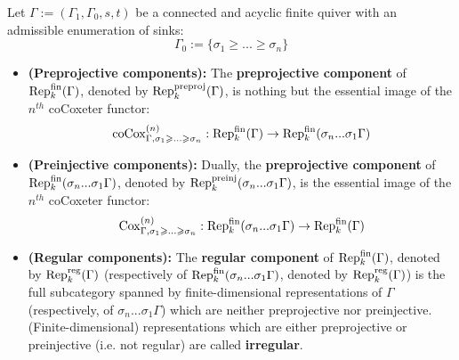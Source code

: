             \begin{definition} \label{def: preprojective_regular_and_preinjective_components}
                Let $\Gamma := (\Gamma_1, \Gamma_0, s, t)$ be a connected and acyclic finite quiver with an admissible enumeration of sinks:
                    $$\Gamma_0 := \{\sigma_1 \geq ... \geq \sigma_n\}$$
                    \begin{itemize}
                        \item \textbf{(Preprojective components):} The \textbf{preprojective component} of $\mathrm{Rep}_k^{\mathrm{fin}}(\Gamma)$, denoted by $\mathrm{Rep}_k^{\mathrm{preproj}}(\Gamma)$, is nothing but the essential image of the $n^{th}$ coCoxeter functor:
                            $$\mathrm{co}\mathrm{Cox}_{\Gamma, \sigma_1 \geqslant ...\geqslant \sigma_n}^{(n)}: \mathrm{Rep}_k^{\mathrm{fin}}(\Gamma) \to \mathrm{Rep}_k^{\mathrm{fin}}(\sigma_n ... \sigma_1 \Gamma)$$
                        \item \textbf{(Preinjective components):} Dually, the \textbf{preprojective component} of $\mathrm{Rep}_k^{\mathrm{fin}}(\sigma_n ... \sigma_1 \Gamma)$, denoted by $\mathrm{Rep}_k^{\mathrm{preinj}}(\sigma_n ... \sigma_1 \Gamma)$, is the essential image of the $n^{th}$ coCoxeter functor:
                            $$\mathrm{Cox}_{\Gamma, \sigma_1 \geqslant ...\geqslant \sigma_n}^{(n)}: \mathrm{Rep}_k^{\mathrm{fin}}(\sigma_n ... \sigma_1 \Gamma) \to \mathrm{Rep}_k^{\mathrm{fin}}(\Gamma)$$
                        \item \textbf{(Regular components):} The \textbf{regular component} of $\mathrm{Rep}_k^{\mathrm{fin}}(\Gamma)$, denoted by $\mathrm{Rep}_k^{\mathrm{reg}}(\Gamma)$ (respectively of $\mathrm{Rep}_k^{\mathrm{fin}}(\sigma_n ... \sigma_1 \Gamma)$, denoted by $\mathrm{Rep}_k^{\mathrm{reg}}(\Gamma)$) is the full subcategory spanned by finite-dimensional representations of $\Gamma$ (respectively, of $\sigma_n ... \sigma_1 \Gamma$) which are neither preprojective nor preinjective. (Finite-dimensional) representations which are either preprojective or preinjective (i.e. not regular) are called \textbf{irregular}.
                    \end{itemize}
            \end{definition}
